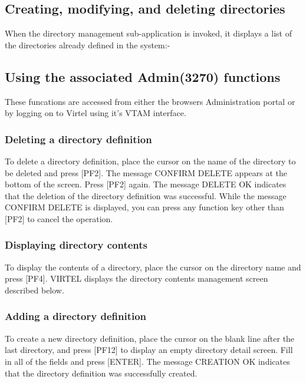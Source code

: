 \documentclass[letterpaper,10pt,english]{sphinxmanual}
\begin{document}
\subsection{Creating, modifying, and deleting directories}
\label{\detokenize{User_Guide:creating-modifying-and-deleting-directories}}
When the directory management sub-application is invoked, it displays a list of the directories already defined in the system:-

 


\subsection{Using the associated Admin(3270) functions}
\label{\detokenize{User_Guide:using-the-associated-admin-3270-functions}}
These funcations are accessed from either the browsers Administration portal or by logging on to Virtel using it’s VTAM interface.


\subsubsection{Deleting a directory definition}
\label{\detokenize{User_Guide:deleting-a-directory-definition}}
To delete a directory definition, place the cursor on the name of the directory to be deleted and press {[}PF2{]}. The message CONFIRM DELETE appears at the bottom of the screen. Press {[}PF2{]} again. The message DELETE OK indicates that the deletion of the directory definition was successful. While the message CONFIRM DELETE is displayed, you can press any function key other than {[}PF2{]} to cancel the operation.


\subsubsection{Displaying directory contents}
\label{\detokenize{User_Guide:displaying-directory-contents}}
To display the contents of a directory, place the cursor on the directory name and press {[}PF4{]}. VIRTEL displays the directory contents management screen described below.


\subsubsection{Adding a directory definition}
\label{\detokenize{User_Guide:adding-a-directory-definition}}
To create a new directory definition, place the cursor on the blank line after the last directory, and press {[}PF12{]} to display an empty directory detail screen. Fill in all of the fields and press {[}ENTER{]}. The message CREATION OK indicates that the directory definition was successfully created.
\end{document}
